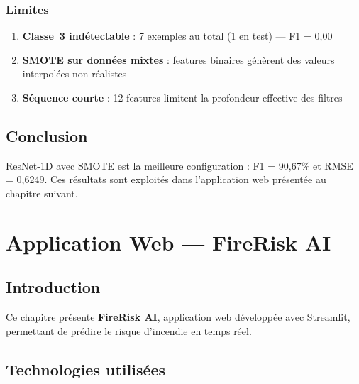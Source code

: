 \documentclass[12pt,a4paper]{report}
\begin{document}
\subsection{Limites}

\begin{enumerate}
    \item \textbf{Classe~3 ind\'{e}tectable} : 7 exemples au total (1 en test) --- F1 = 0,00
    \item \textbf{SMOTE sur donn\'{e}es mixtes} : features binaires g\'{e}n\`{e}rent des valeurs interpol\'{e}es non r\'{e}alistes
    \item \textbf{S\'{e}quence courte} : 12 features limitent la profondeur effective des filtres
\end{enumerate}

\section{Conclusion}

ResNet-1D avec SMOTE est la meilleure configuration : F1 = 90,67\% et RMSE = 0,6249. Ces r\'{e}sultats sont exploit\'{e}s dans l'application web pr\'{e}sent\'{e}e au chapitre suivant.

\chapter{Application Web --- FireRisk AI}

\section{Introduction}

Ce chapitre pr\'{e}sente \textbf{FireRisk AI}, application web d\'{e}velopp\'{e}e avec Streamlit, permettant de pr\'{e}dire le risque d'incendie en temps r\'{e}el.

\section{Technologies utilis\'{e}es}
\end{document}
